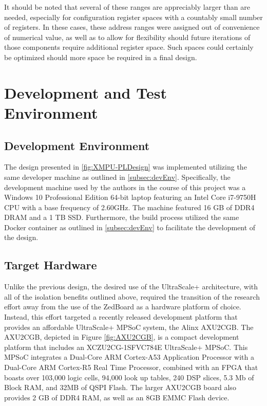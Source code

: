 It should be noted that several of these ranges are appreciably larger than are needed, especially for configuration register spaces with a countably small number of registers. In these cases, these address ranges were assigned out of convenience of numerical value, as well as to allow for flexibility should future iterations of those components require additional register space. Such spaces could certainly be optimized should more space be required in a final design.

\section{Development and Test Environment}\label{sec:DMAEnvironment}

\subsection{Development Environment}\label{subsec:DMAEnvironmentDev}
The design presented in \ref{fig:XMPU-PLDesign} was implemented utilizing the same developer machine as outlined in \ref{subsec:devEnv}. Specifically, the development machine used by the authors in the course of this project was a Windows 10 Professional Edition 64-bit laptop featuring an Intel Core i7-9750H CPU with a base frequency of 2.60GHz. The machine featured 16 GB of DDR4 DRAM and a 1 TB SSD. Furthermore, the build process utilized the same Docker container as outlined in \ref{subsec:devEnv} to facilitate the development of the design.

\subsection{Target Hardware}\label{subsec:DMAEnvironmentHW}
Unlike the previous design, the desired use of the UltraScale+ architecture, with all of the isolation benefits outlined above, required the transition of the research effort away from the use of the ZedBoard as a hardware platform of choice. Instead, this effort targeted a recently released development platform that provides an affordable UltraScale+ MPSoC system, the Alinx AXU2CGB. The AXU2CGB, depicted in Figure \ref{fig:AXU2CGB}, is a compact development platform that includes an XCZU2CG-1SFVC784E UltraScale+ MPSoC. This MPSoC integrates a Dual-Core ARM Cortex-A53 Application Processor with a Dual-Core ARM Cortex-R5 Real Time Processor, combined with an FPGA that boasts over 103,000 logic cells, 94,000 look up tables, 240 DSP slices, 5.3 Mb of Block RAM, and 32MB of QSPI Flash. The larger AXU2CGB board also provides 2 GB of DDR4 RAM, as well as an 8GB EMMC Flash device.

